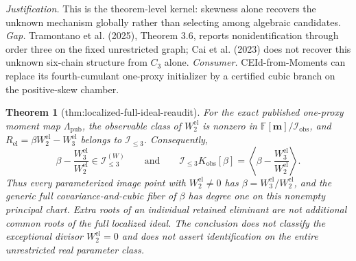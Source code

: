 \documentclass{article}
\newtheorem{theorem}{Theorem}
\begin{document}
\par\smallskip\noindent \textit{Justification.} This is the theorem-level kernel: skewness alone recovers the unknown mechanism globally rather than selecting among algebraic candidates. \textit{Gap.} Tramontano et al. (2025), Theorem 3.6, reports nonidentification through order three on the fixed unrestricted graph; Cai et al. (2023) does not recover this unknown six-chain structure from \(C_3\) alone. \textit{Consumer.} CEId-from-Moments can replace its fourth-cumulant one-proxy initializer by a certified cubic branch on the positive-skew chamber.

\begin{theorem}[thm:localized-full-ideal-reaudit]\label{thm:localized-full-ideal-reaudit}
For the exact published one-proxy moment map \(\Lambda_{\mathrm{pub}}\), the observable class of \(W_2^{\mathrm{el}}\) is nonzero in \(\mathbb F[\mathbf m]/\mathcal I_{\mathrm{obs}}\), and \(R_{\mathrm{el}}=\beta W_2^{\mathrm{el}}-W_3^{\mathrm{el}}\) belongs to \(\mathcal I_{\leq3}\).  Consequently,
\[
\beta-\frac{W_3^{\mathrm{el}}}{W_2^{\mathrm{el}}}\in\mathcal I_{\leq3}^{(W)}
\qquad\text{and}\qquad
\mathcal I_{\leq3}K_{\mathrm{obs}}[\beta]
=\left\langle\beta-\frac{W_3^{\mathrm{el}}}{W_2^{\mathrm{el}}}\right\rangle.
\]
Thus every parameterized image point with \(W_2^{\mathrm{el}}\neq0\) has \(\beta=W_3^{\mathrm{el}}/W_2^{\mathrm{el}}\), and the generic full covariance-and-cubic fiber of \(\beta\) has degree one on this nonempty principal chart.  Extra roots of an individual retained eliminant are not additional common roots of the full localized ideal.  The conclusion does not classify the exceptional divisor \(W_2^{\mathrm{el}}=0\) and does not assert identification on the entire unrestricted real parameter class.
\end{theorem}
\end{document}
